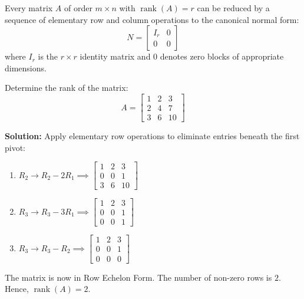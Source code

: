 \begin{theorem}
Every matrix $A$ of order $m \times n$ with $\operatorname{rank}(A) = r$ can be reduced by a sequence of elementary row and column operations to the canonical normal form:
\begin{equation}
N = \begin{bmatrix} I_r & 0 \\ 0 & 0 \end{bmatrix}
\end{equation}
where $I_r$ is the $r \times r$ identity matrix and $0$ denotes zero blocks of appropriate dimensions.
\end{theorem}

\begin{example}
Determine the rank of the matrix:
\begin{equation*}
A = \begin{bmatrix} 1 & 2 & 3 \\ 2 & 4 & 7 \\ 3 & 6 & 10 \end{bmatrix}
\end{equation*}

\textbf{Solution:}
Apply elementary row operations to eliminate entries beneath the first pivot:
\begin{enumerate}
    \item $R_2 \to R_2 - 2R_1 \implies \begin{bmatrix} 1 & 2 & 3 \\ 0 & 0 & 1 \\ 3 & 6 & 10 \end{bmatrix}$
    \item $R_3 \to R_3 - 3R_1 \implies \begin{bmatrix} 1 & 2 & 3 \\ 0 & 0 & 1 \\ 0 & 0 & 1 \end{bmatrix}$
    \item $R_3 \to R_3 - R_2 \implies \begin{bmatrix} 1 & 2 & 3 \\ 0 & 0 & 1 \\ 0 & 0 & 0 \end{bmatrix}$
\end{enumerate}
The matrix is now in Row Echelon Form. The number of non-zero rows is $2$. Hence, $\operatorname{rank}(A) = 2$.
\end{example}

